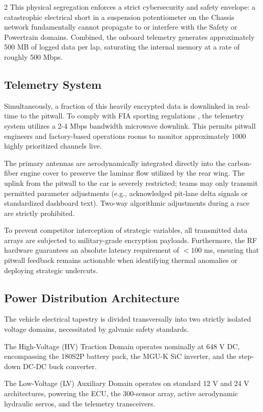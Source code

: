 \begin{multicols}{2}
This physical segregation enforces a strict cybersecurity and safety envelope: a catastrophic electrical short in a suspension potentiometer on the Chassis network fundamentally cannot propagate to or interfere with the Safety or Powertrain domains. Combined, the onboard telemetry generates approximately 500 MB of logged data per lap, saturating the internal memory at a rate of roughly 500 Mbps.

\subsection{Telemetry System}

Simultaneously, a fraction of this heavily encrypted data is downlinked in real-time to the pitwall. To comply with FIA sporting regulations \cite{FIA_2026_Technical_Regulations}, the telemetry system utilizes a 2-4 Mbps bandwidth microwave downlink. This permits pitwall engineers and factory-based operations rooms to monitor approximately 1000 highly prioritized channels live.

The primary antennas are aerodynamically integrated directly into the carbon-fiber engine cover to preserve the laminar flow utilized by the rear wing. The uplink from the pitwall to the car is severely restricted; teams may only transmit permitted parameter adjustments (e.g., acknowledged pit-lane delta signals or standardized dashboard text). Two-way algorithmic adjustments during a race are strictly prohibited. 

To prevent competitor interception of strategic variables, all transmitted data arrays are subjected to military-grade encryption payloads. Furthermore, the RF hardware guarantees an absolute latency requirement of $<100$ ms, ensuring that pitwall feedback remains actionable when identifying thermal anomalies or deploying strategic undercuts.

\subsection{Power Distribution Architecture}

The vehicle electrical tapestry is divided transversally into two strictly isolated voltage domains, necessitated by galvanic safety standards.

The High-Voltage (HV) Traction Domain operates nominally at 648 V DC, encompassing the 180S2P battery pack, the MGU-K SiC inverter, and the step-down DC-DC buck converter. 

The Low-Voltage (LV) Auxiliary Domain operates on standard 12 V and 24 V architectures, powering the ECU, the 300-sensor array, active aerodynamic hydraulic servos, and the telemetry transceivers. 


\end{multicols}
